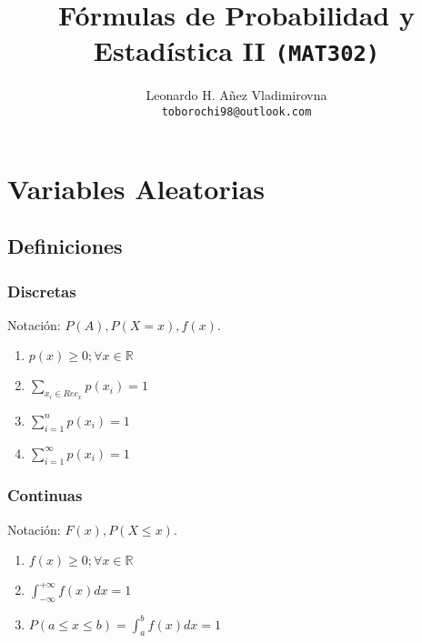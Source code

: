 \documentclass[10pt,letterpaper]{article}
\author{Leonardo H. Añez Vladimirovna\\
\texttt{toborochi98@outlook.com}
}
\title{Fórmulas de Probabilidad y Estadística II \texttt{(MAT302)}}
\begin{document}
\maketitle

\section{Variables Aleatorias}
\subsection{Definiciones}
\begin{multicols}{2}
\subsubsection{Discretas}
\begin{flushleft}
Notación:  $P(A),P(X=x),f(x)$.
\begin{enumerate}
\item $p(x)\geq 0 ; \forall x \in \mathbb{R}$
\item $\displaystyle\sum_{x_i\in Rec_x} p(x_i)=1$
\item $\displaystyle\sum_{i=1}^{n} p(x_i)=1$
\item $\displaystyle\sum_{i=1}^{\infty} p(x_i)=1$
\end{enumerate}
\end{flushleft}
\columnbreak
\subsubsection{Continuas}
\begin{flushleft}
Notación:  $F(x),P(X\leq x)$.
\begin{enumerate}
\item $f(x)\geq 0;\forall x \in \mathbb{R}$
\item $\displaystyle\int_{-\infty}^{+\infty} f(x)dx = 1$
\item $P(a\leq x \leq b) = \displaystyle\int_{a}^{b} f(x)dx=1$
\end{enumerate}
\end{flushleft}
\end{multicols}
\end{document}

